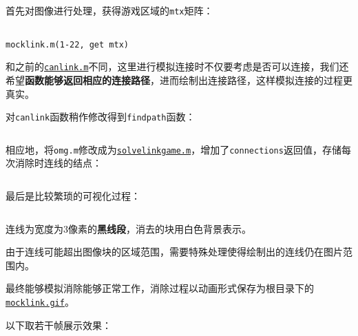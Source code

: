 \documentclass{article}
\numberwithin{figure}{section}
\numberwithin{table}{section}
\numberwithin{listing}{section}
\numberwithin{equation}{section}
\begin{document}
\begin{enumerate}
                首先对图像进行处理，获得游戏区域的\texttt{mtx}矩阵：

                \begin{listing}[H]
                    \inputminted[firstline=1,lastline=22]{matlab}{../process/mocklink.m}
                    \caption{\texttt{mocklink.m(1-22, get mtx)}}
                \end{listing}

                和之前的\href{../linkgame/canlink.m}{\texttt{canlink.m}}不同，这里进行模拟连接时不仅要考虑是否可以连接，我们还希望\textbf{函数能够返回相应的连接路径}，进而绘制出连接路径，这样模拟连接的过程更真实。

                对\texttt{canlink}函数稍作修改得到\texttt{findpath}函数：

                \inputminted{matlab}{../process/findpath.m}
                \begingroup
                \endgroup

                相应地，将\texttt{omg.m}修改成为\href{../process/solvelinkgame.m}{\texttt{solvelinkgame.m}}，增加了\texttt{connections}返回值，存储每次消除时连线的结点：

                \inputminted{matlab}{../process/solvelinkgame.m}
                \begingroup
                \endgroup

                最后是比较繁琐的可视化过程：

                \inputminted[firstline=22,lastline=74]{matlab}{../process/mocklink.m}
                \begingroup
                \endgroup

                连线为宽度为3像素的\textbf{黑线段}，消去的块用白色背景表示。

                由于连线可能超出图像块的区域范围，需要特殊处理使得绘制出的连线仍在图片范围内。

                最终能够模拟消除能够正常工作，消除过程以动画形式保存为根目录下的\href{../mocklink.gif}{\texttt{mocklink.gif}}。

                以下取若干帧展示效果：


\end{enumerate}
\end{document}
